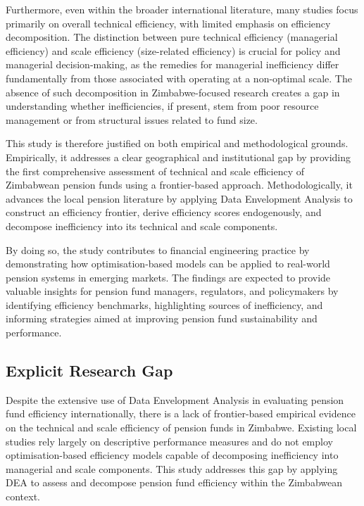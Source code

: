 \documentclass[12pt,a4paper]{article}
\begin{document}
Furthermore, even within the broader international literature, many studies focus primarily on overall technical efficiency, with limited emphasis on efficiency decomposition. The distinction between pure technical efficiency (managerial efficiency) and scale efficiency (size-related efficiency) is crucial for policy and managerial decision-making, as the remedies for managerial inefficiency differ fundamentally from those associated with operating at a non-optimal scale. The absence of such decomposition in Zimbabwe-focused research creates a gap in understanding whether inefficiencies, if present, stem from poor resource management or from structural issues related to fund size.

This study is therefore justified on both empirical and methodological grounds. Empirically, it addresses a clear geographical and institutional gap by providing the first comprehensive assessment of technical and scale efficiency of Zimbabwean pension funds using a frontier-based approach. Methodologically, it advances the local pension literature by applying Data Envelopment Analysis to construct an efficiency frontier, derive efficiency scores endogenously, and decompose inefficiency into its technical and scale components.

By doing so, the study contributes to financial engineering practice by demonstrating how optimisation-based models can be applied to real-world pension systems in emerging markets. The findings are expected to provide valuable insights for pension fund managers, regulators, and policymakers by identifying efficiency benchmarks, highlighting sources of inefficiency, and informing strategies aimed at improving pension fund sustainability and performance.

\subsection{Explicit Research Gap}

Despite the extensive use of Data Envelopment Analysis in evaluating pension fund efficiency internationally, there is a lack of frontier-based empirical evidence on the technical and scale efficiency of pension funds in Zimbabwe. Existing local studies rely largely on descriptive performance measures and do not employ optimisation-based efficiency models capable of decomposing inefficiency into managerial and scale components. This study addresses this gap by applying DEA to assess and decompose pension fund efficiency within the Zimbabwean context.
\end{document}
